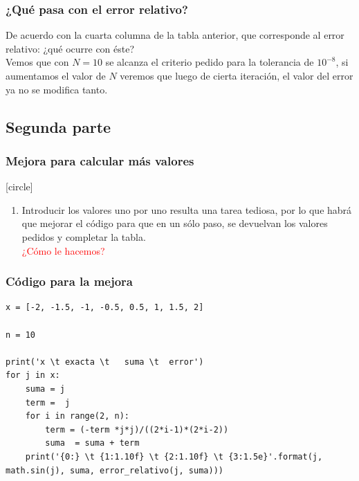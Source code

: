 \begin{frame}
\frametitle{¿Qué pasa con el error relativo?}
De acuerdo con la cuarta columna de la tabla anterior, que corresponde al error relativo: ¿qué ocurre con éste?
\\
\bigskip
\pause
Vemos que con $N=10$ se alcanza el criterio pedido para la tolerancia de $10^{-8}$, si aumentamos el valor de $N$ veremos que luego de cierta iteración, el valor del error ya no se modifica tanto.
\end{frame}
\subsection{Segunda parte}
\begin{frame}
\frametitle{Mejora para calcular más valores}
[circle]
\begin{enumerate}[<+->]
\conti
\item Introducir los valores uno por uno resulta una tarea tediosa, por lo que habrá que mejorar el código para que en un sólo paso, se devuelvan los valores pedidos y completar la tabla.
\\
\bigskip
\textcolor{red}{¿Cómo le hacemos?}
\end{enumerate}
\end{frame}
\begin{frame}
\frametitle{Código para la mejora}
\begin{lstlisting}[style=codigopython]
x = [-2, -1.5, -1, -0.5, 0.5, 1, 1.5, 2]

n = 10

print('x \t exacta \t   suma \t  error')
for j in x:
    suma = j
    term =  j
    for i in range(2, n):
        term = (-term *j*j)/((2*i-1)*(2*i-2))
        suma  = suma + term
    print('{0:} \t {1:1.10f} \t {2:1.10f} \t {3:1.5e}'.format(j, math.sin(j), suma, error_relativo(j, suma)))
\end{lstlisting}
\end{frame}
